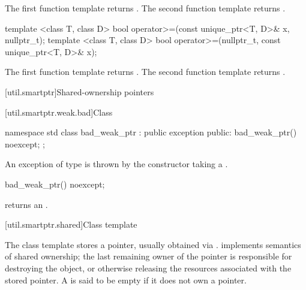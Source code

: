 \begin{itemdescr}
\pnum
\returns
The first function template returns .
The second function template returns .
\end{itemdescr}

%
\begin{itemdecl}
template <class T, class D>
  bool operator>=(const unique_ptr<T, D>& x, nullptr_t);
template <class T, class D>
  bool operator>=(nullptr_t, const unique_ptr<T, D>& x);
\end{itemdecl}

\begin{itemdescr}
\pnum
\returns
The first function template returns .
The second function template returns .
\end{itemdescr}

%
[util.smartptr]{Shared-ownership pointers}

[util.smartptr.weak.bad]{Class }
%
\begin{codeblock}
namespace std {
  class bad_weak_ptr : public exception {
  public:
    bad_weak_ptr() noexcept;
  };
}
\end{codeblock}

\pnum
An exception of type  is thrown by the 
constructor taking a .

%
%
\begin{itemdecl}
bad_weak_ptr() noexcept;
\end{itemdecl}

\begin{itemdescr}
\pnum\postconditions  {} returns an
 \ntbs.

\end{itemdescr}

[util.smartptr.shared]{Class template }

\pnum
{}%
The  class template stores a pointer, usually obtained
via .  implements semantics of shared ownership;
the last remaining owner of the pointer is responsible for destroying
the object, or otherwise releasing the resources associated with the stored pointer. A
 is said to be empty if it does not own a pointer.

